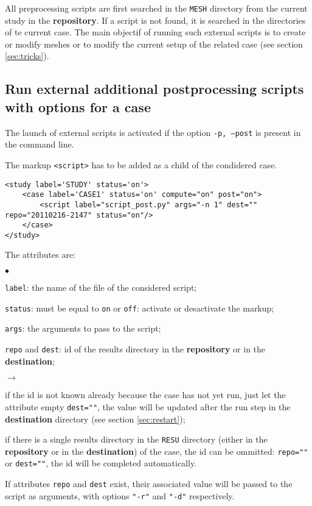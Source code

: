 \documentclass[a4paper,10pt,twoside]{csshortdoc}
\begin{document}
All preprocessing scripts are first searched in the \texttt{MESH} directory
from the current study in the \textbf{repository}. If a script is not found,
it is searched in the directories of te current case.
The main objectif of running such external scripts is to create or modify
meshes or to modify the current setup of the related case (see section
\ref{sec:tricks}).

\subsection{Run external additional postprocessing scripts with options for a case}

The launch of external scripts is activated if the option \texttt{-p, --post}
is present in the command line.

The markup \texttt{<script>} has to be added as a child of the condidered case.

\small
\begin{verbatim}
<study label='STUDY' status='on'>
    <case label='CASE1' status='on' compute="on" post="on">
        <script label="script_post.py" args="-n 1" dest="" repo="20110216-2147" status="on"/>
    </case>
</study>
\end{verbatim}
\normalsize

The attributes are:
\begin{list}{$\bullet$}{}
\item \texttt{label}: the name of the file of the considered script;
\item \texttt{status}: must be equal to \texttt{on} or \texttt{off}:
activate or desactivate the markup;
\item \texttt{args}: the arguments to pass to the script;
\item \texttt{repo} and \texttt{dest}: id of the results directory in the
\textbf{repository} or in the \textbf{destination};
\begin{list}{$\rightarrow$}{}
\item if the id is not known already because the case has not yet run, just let
the attribute empty \texttt{dest=""}, the value will be updated after the run
step in the \textbf{destination} directory (see section \ref{sec:restart});
\item if there is a single results directory in the \texttt{RESU} directory
(either in the \textbf{repository} or in the \textbf{destination}) of the case,
the id can be ommitted: \texttt{repo=""} or \texttt{dest=""}, the id will be
completed automatically.
\end{list}
If attributes \texttt{repo} and \texttt{dest} exist, their associated value
will be passed to the script as arguments, with options \texttt{"-r"} and
\texttt{"-d"} respectively.
\end{list}
\end{document}
